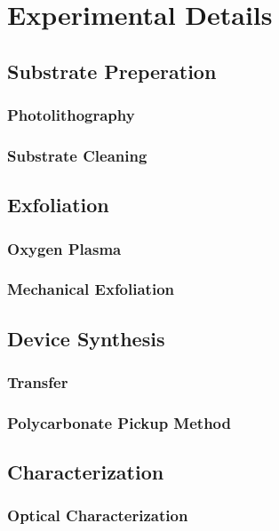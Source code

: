 \chapter{Experimental Details}\label{chap:exp_details}

\section{Substrate Preperation}\label{sec:sample_prep}
\subsection{Photolithography}\label{subsec:photolithography}
\subsection{Substrate Cleaning}\label{subsec:cleaning}

\section{Exfoliation}\label{sec:exfoliation}
\subsection{Oxygen Plasma}\label{subsec:o2plasma}
\subsection{Mechanical Exfoliation}\label{subsec:mech_exfoliation}

\section{Device Synthesis}\label{sec:synthesis}
\subsection{Transfer}\label{subsec:transfer}
\subsection{Polycarbonate Pickup Method}\label{subsec:pc_pickup}

\section{Characterization}\label{sec:characterization}
\subsection{Optical Characterization}\label{subsec:characterization_optical}
